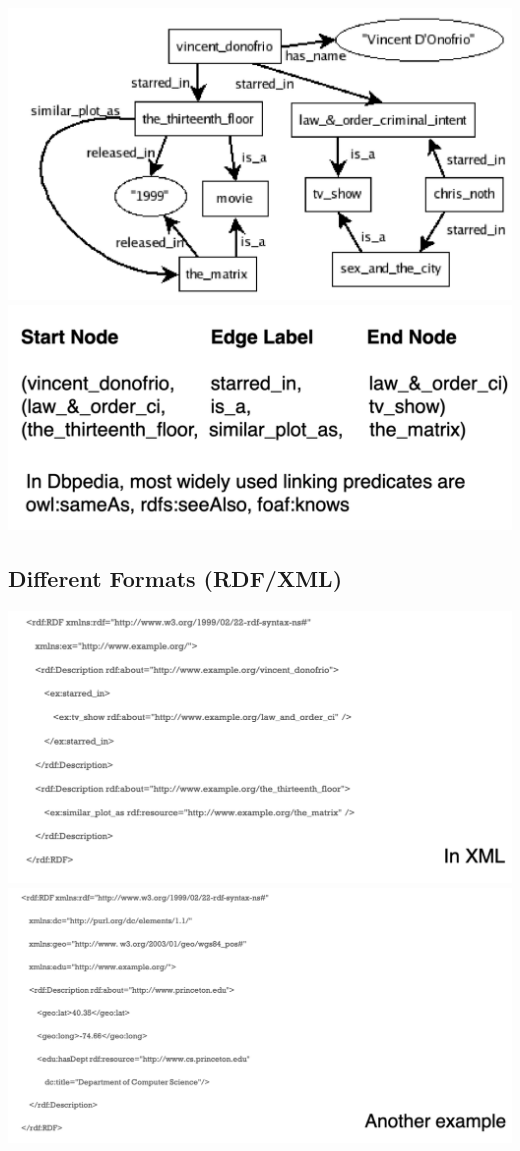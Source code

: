 \documentclass[11pt]{article}
\theoremstyle{definition}
\begin{document}
\includegraphics[width=\textwidth/2-2.08049pt]{8.png}
\includegraphics[width=\textwidth/2]{9.png}

\subsection{Different Formats (RDF/XML)}
\includegraphics[width=\textwidth/2-2.08049pt]{10.png}
\includegraphics[width=\textwidth/2]{11.png}
\end{document}
